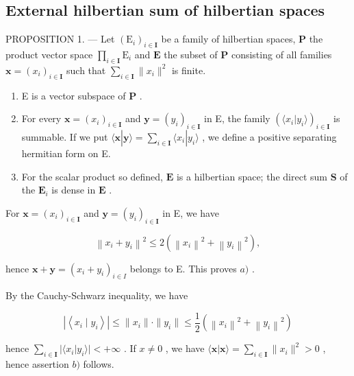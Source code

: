 \subsection{External hilbertian sum of hilbertian spaces}

PROPOSITION 1. --- Let \((\mathrm{E}_i)_{i\in \mathbf{I}}\) be a family of hilbertian spaces, \(\mathbf{P}\) the product vector space \(\prod_{i\in \mathbf{I}}\mathrm{E}_i\) and \(\mathbf{E}\) the subset of \(\mathbf{P}\) consisting of all families \(\mathbf{x} = (x_i)_{i\in \mathbf{I}}\) such that \(\sum_{i\in \mathbf{I}}\| x_i\|^2\) is finite.

\begin{enumerate}
\def\labelenumi{\alph{enumi})}
\item
  E is a vector subspace of \(\mathbf{P}\) .
\item
  For every \(\mathbf{x} = (x_i)_{i\in \mathbf{I}}\) and \(\mathbf{y} = (y_i)_{i\in \mathbf{I}}\) in E, the family \((\langle x_i|y_i\rangle)_{i\in \mathbf{I}}\) is summable. If we put \(\langle \mathbf{x}|\mathbf{y}\rangle = \sum_{i\in \mathbf{I}}\langle x_i|y_i\rangle\) , we define a positive separating hermitian form on E.
\item
  For the scalar product so defined, \(\mathbf{E}\) is a hilbertian space; the direct sum \(\mathbf{S}\) of the \(\mathbf{E}_i\) is dense in \(\mathbf{E}\) .
\end{enumerate}

For \(\mathbf{x} = (x_{i})_{i\in \mathbf{I}}\) and \(\mathbf{y} = (y_i)_{i\in \mathbf{I}}\) in E, we have

\[
\left\| x _ {i} + y _ {i} \right\| ^ {2} \leqslant 2 \left(\left\| x _ {i} \right\| ^ {2} + \left\| y _ {i} \right\| ^ {2}\right),
\]

hence \(\mathbf{x} + \mathbf{y} = (x_i + y_i)_{i\in I}\) belongs to E. This proves \(a)\) .

By the Cauchy-Schwarz inequality, we have

\[
\left| \left\langle x _ {i} \mid y _ {i} \right\rangle \right| \leqslant \| x _ {i} \| \cdot \| y _ {i} \| \leqslant \frac {1}{2} \left(\left\| x _ {i} \right\| ^ {2} + \left\| y _ {i} \right\| ^ {2}\right)
\]

hence \(\sum_{i\in \mathbf{I}}|\langle x_i|y_i\rangle | < +\infty\) . If \(x\neq 0\) , we have \(\langle \mathbf{x}|\mathbf{x}\rangle = \sum_{i\in \mathbf{I}}\| x_i\|^2 >0\) , hence assertion \(b)\) follows.

